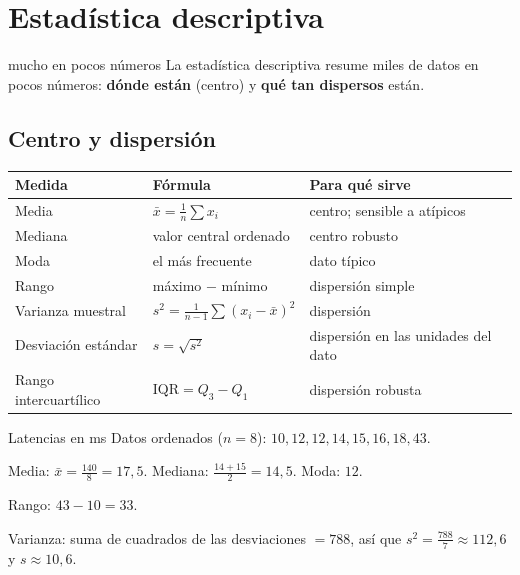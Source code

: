\section{Estad\'istica descriptiva}
\label{sec:5-4}

\begin{tmconcepto}{mucho en pocos n\'umeros}
La estad\'istica descriptiva resume miles de datos en pocos n\'umeros: \textbf{d\'onde est\'an} (centro) y \textbf{qu\'e tan dispersos} est\'an.
\end{tmconcepto}


\subsection{Centro y dispersi\'on}
\begin{center}
\begin{tabular}{|l|p{4.4cm}|p{4.6cm}|}
\hline
\rowcolor{tmAzulClaro}\textbf{Medida} & \textbf{F\'ormula} & \textbf{Para qu\'e sirve}\\ \hline
Media & $\bar x=\frac1n\sum x_i$ & centro; sensible a at\'ipicos\\ \hline
Mediana & valor central ordenado & centro robusto\\ \hline
Moda & el m\'as frecuente & dato t\'ipico\\ \hline
Rango & m\'aximo $-$ m\'inimo & dispersi\'on simple\\ \hline
Varianza muestral & $s^2=\frac{1}{n-1}\sum(x_i-\bar x)^2$ & dispersi\'on\\ \hline
Desviaci\'on est\'andar & $s=\sqrt{s^2}$ & dispersi\'on en las unidades del dato\\ \hline
Rango intercuart\'ilico & $\mathrm{IQR}=Q_3-Q_1$ & dispersi\'on robusta\\ \hline
\end{tabular}
\end{center}

\begin{tmejemplo}{Latencias en ms}
Datos ordenados ($n=8$): $10, 12, 12, 14, 15, 16, 18, 43$.
\begin{tmpasos}
\item Media: $\bar x=\frac{140}8=17{,}5$. Mediana: $\frac{14+15}2=14{,}5$. Moda: $12$.
\item Rango: $43-10=33$.
\item Varianza: suma de cuadrados de las desviaciones $=788$, as\'i que $s^2=\frac{788}7\approx112{,}6$ y $s\approx10{,}6$.
\end{tmpasos}
\end{tmejemplo}

